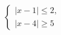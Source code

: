 \begin{ex}[type=ineq_system]
	\begin{condition}
		\( \left\{
		\begin{array}{l}
			|x-1|\le2,\\
			|x-4|\ge5
		\end{array}
		\right. \)
	\end{condition}
\end{ex}
